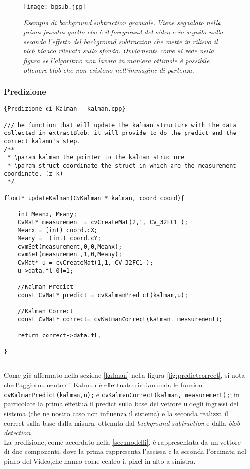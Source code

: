 \begin{figure}[hbp]
\centering
	\texttt{[image: bgsub.jpg]}
\caption[Esempio di background subtraction graduale]{\textit{Esempio di background subtraction graduale. Viene segnalato nella prima finestra quello che è il foreground del video e in seguito nella seconda l'effetto del background subtraction che mette in rilievo il blob bianco rilevato sullo sfondo. Ovviamente come si vede nella figura se l'algoritmo non lavora in maniera ottimale è possibile ottenere blob che non esistono nell'immagine di partenza.}\label{fig:bgsub}}
\end{figure}
\newpage

\subsubsection{Predizione}

\lstset{language=c++}
\lstset{commentstyle=\emph}
\begin{lstlisting}[frame=r,caption=Predizione di Kalman - kalman.cpp ,breaklines=true,basicstyle=\small]{Predizione di Kalman - kalman.cpp}

///The function that will update the kalman structure with the data collected in extractBlob. it will provide to do the predict and the correct kalamn's step.
/**
 * \param kalman the pointer to the kalman structure
 * \param struct coordinate the struct in which are the measurement coordinate. (z_k)
 */

float* updateKalman(CvKalman * kalman, coord coord){
	
	int Meanx, Meany;
	CvMat* measurement = cvCreateMat(2,1, CV_32FC1 );
	Meanx = (int) coord.cX;
	Meany =  (int) coord.cY;
	cvmSet(measurement,0,0,Meanx);
	cvmSet(measurement,1,0,Meany);
	CvMat* u = cvCreateMat(1,1, CV_32FC1 );
	u->data.fl[0]=1;
	
	//Kalman Predict
	const CvMat* predict = cvKalmanPredict(kalman,u);

	//Kalman Correct
	const CvMat* correct= cvKalmanCorrect(kalman, measurement);
	
	return correct->data.fl;

}


\end{lstlisting}

Come già affermato nella sezione \ref{kalman} nella figura \ref{fig:predictcorrect}, si nota che l'aggiornamento di Kalman è effettuato richiamando le funzioni \texttt{cvKalmanPredict(kalman,u);} e  \texttt{cvKalmanCorrect(kalman, measurement);}; in particolare la prima effettua il predict sulla base del vettore \texttt{u} degli ingressi del sistema (che ne nostro caso non influenza il sistema) e la seconda realizza il correct sulla base dalla misura, ottenuta dal \textit{background subtraction} e dalla \textit{blob detection}. \\
La predizione, come accordato nella \ref{sec:modelli}, è rappresentata da un vettore di due componenti, dove la prima rappresenta l'ascissa e la seconda l'ordinata nel piano del Video,che hanno come centro il pixel in alto a sinistra.

